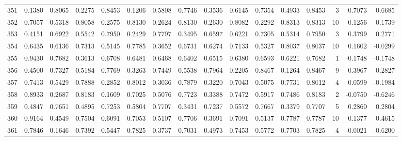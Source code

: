 \begin{tabular}{lrrrrrrrrrrrrrrr}
351 &      0.1380 &  0.8065 &  0.2275 &  0.8453 &  0.1206 &  0.5808 &  0.7746 &  0.3536 &  0.6145 &  0.7354 &   0.4933 &     0.8453 &      3 &                    0.7073 &                     0.6685 \\
352 &      0.7057 &  0.5318 &  0.8058 &  0.2575 &  0.8130 &  0.2624 &  0.8130 &  0.2630 &  0.8082 &  0.2292 &   0.8313 &     0.8313 &     10 &                    0.1256 &                    -0.1739 \\
353 &      0.4151 &  0.6922 &  0.5542 &  0.7950 &  0.2429 &  0.7797 &  0.3495 &  0.6597 &  0.6221 &  0.7305 &   0.5314 &     0.7950 &      3 &                    0.3799 &                     0.2771 \\
354 &      0.6435 &  0.6136 &  0.7313 &  0.5145 &  0.7785 &  0.3652 &  0.6731 &  0.6274 &  0.7133 &  0.5327 &   0.8037 &     0.8037 &     10 &                    0.1602 &                    -0.0299 \\
355 &      0.9430 &  0.7682 &  0.3613 &  0.6708 &  0.6481 &  0.6468 &  0.6402 &  0.6515 &  0.6380 &  0.6593 &   0.6221 &     0.7682 &      1 &                   -0.1748 &                    -0.1748 \\
356 &      0.4500 &  0.7327 &  0.5184 &  0.7769 &  0.3263 &  0.7449 &  0.5538 &  0.7964 &  0.2205 &  0.8467 &   0.1264 &     0.8467 &      9 &                    0.3967 &                     0.2827 \\
357 &      0.7413 &  0.5429 &  0.7888 &  0.2852 &  0.8012 &  0.3036 &  0.7879 &  0.3220 &  0.7043 &  0.5075 &   0.7731 &     0.8012 &      4 &                    0.0599 &                    -0.1984 \\
358 &      0.8933 &  0.2687 &  0.8183 &  0.1609 &  0.7025 &  0.5076 &  0.7723 &  0.3388 &  0.7472 &  0.5917 &   0.7486 &     0.8183 &      2 &                   -0.0750 &                    -0.6246 \\
359 &      0.4847 &  0.7651 &  0.4895 &  0.7253 &  0.5804 &  0.7707 &  0.3431 &  0.7237 &  0.5572 &  0.7667 &   0.3379 &     0.7707 &      5 &                    0.2860 &                     0.2804 \\
360 &      0.9164 &  0.4549 &  0.7504 &  0.6091 &  0.7053 &  0.5107 &  0.7706 &  0.3691 &  0.7091 &  0.5137 &   0.7787 &     0.7787 &     10 &                   -0.1377 &                    -0.4615 \\
361 &      0.7846 &  0.1646 &  0.7392 &  0.5447 &  0.7825 &  0.3737 &  0.7031 &  0.4973 &  0.7453 &  0.5772 &   0.7703 &     0.7825 &      4 &                   -0.0021 &                    -0.6200 \\

\end{tabular}
